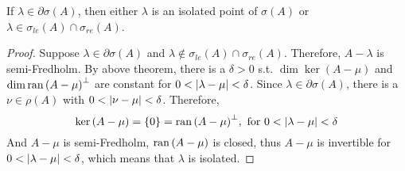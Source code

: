 \documentclass[a4paper,11pt]{report}
\begin{document}
\begin{thm}
	If $\lambda \in \partial{\sigma(A)}$, then either $\lambda$ is an isolated point of $\sigma(A)$ or $\lambda \in \sigma_{le}(A) \cap \sigma_{re}(A)$.
\end{thm}
\begin{proof}
	Suppose $\lambda \in \partial{\sigma(A)}$ and $\lambda \notin \sigma_{le}(A) \cap \sigma_{re}(A)$. Therefore, $A-\lambda$ is semi-Fredholm. By above theorem, there is a $\delta > 0$ s.t. $\dim{\ker{(A - \mu)}}$ and $\dim{\operatorname{ran}{(A - \mu)}^{\bot}}$ are constant for $0< \left\lvert\lambda - \mu\right\lvert < \delta$. Since $\lambda \in \partial{\sigma(A)}$, there is a $\nu \in \rho(A)$ with $0< \left\lvert\nu - \mu\right\lvert < \delta$. Therefore,
	\begin{equation*}
		\ker{(A-\mu)} = \{0\} = \operatorname{ran}{(A-\mu)}^{\bot}, \text{ for } 0 < \left\lvert\lambda - \mu\right\lvert < \delta
	\end{equation*}
	And $A-\mu$ is semi-Fredholm, $\operatorname{ran}{(A-\mu)}$ is closed, thus $A-\mu$ is invertible for $0 < \left\lvert\lambda - \mu\right\lvert < \delta$, which means that $\lambda$ is isolated.
\end{proof}
\end{document}
